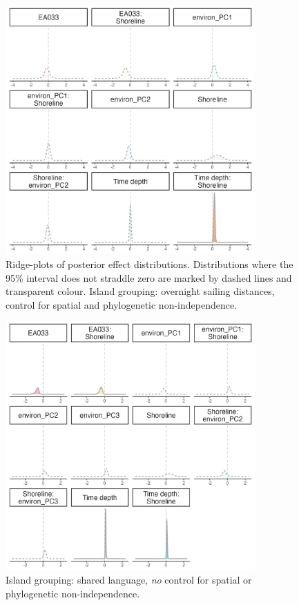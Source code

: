 \documentclass[unnumsec,webpdf,modern,medium]{oup-authoring-template}
\begin{document}
\begin{figure}[ht]
\includegraphics[width=0.85\textwidth]{brms_SBZR_control_spatialphylo_group_full_effect_ridge_panels_plot.png}
\caption{Ridge-plots of posterior effect distributions. Distributions where the 95\% interval does not straddle zero are marked by dashed lines and transparent colour. Island grouping: overnight sailing distances, control for spatial and phylogenetic non-independence.}
\label{brms_SBZR_control_spatialphylo_group_full_effect_ridge_panels_plot}
\end{figure}




\begin{figure}[ht]
\includegraphics[width=0.85\textwidth]{brms_medium_control_none_group_full_effect_ridge_panels_plot.png}
\caption{Island grouping: shared language, \emph{no} control for spatial or phylogenetic non-independence.}
\label{brms_medium_control_none_group_full_effect_ridge_panels_plot}
\end{figure}
\end{document}
